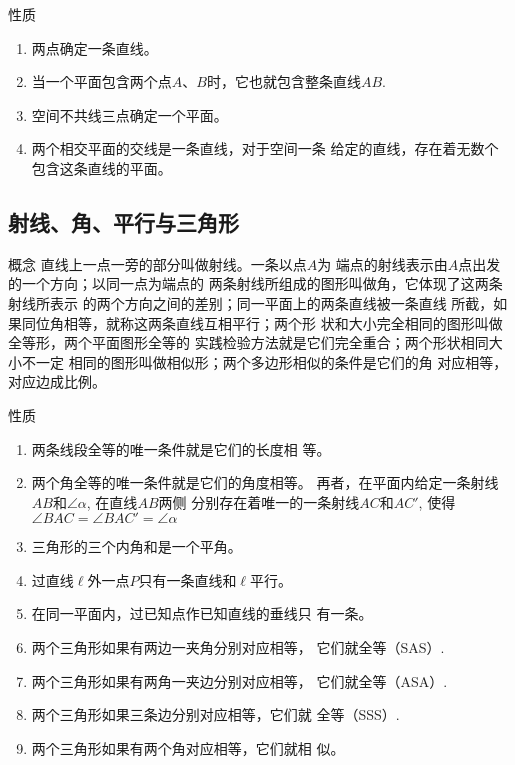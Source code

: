 \begin{blk}
	{性质}
\begin{enumerate}
	\item 两点确定一条直线。
	\item 当一个平面包含两个点$A$、$B$时，它也就包含整条直线$AB$.
	\item 空间不共线三点确定一个平面。
	\item 两个相交平面的交线是一条直线，对于空间一条
	给定的直线，存在着无数个包含这条直线的平面。
\end{enumerate}
\end{blk}

\subsection*{射线、角、平行与三角形}

\begin{blk}
	{概念} 直线上一点一旁的部分叫做射线。一条以点$A$为
端点的射线表示由$A$点出发的一个方向；以同一点为端点的
两条射线所组成的图形叫做角，它体现了这两条射线所表示
的两个方向之间的差别；同一平面上的两条直线被一条直线
所截，如果同位角相等，就称这两条直线互相平行；两个形
状和大小完全相同的图形叫做全等形，两个平面图形全等的
实践检验方法就是它们完全重合；两个形状相同大小不一定
相同的图形叫做相似形；两个多边形相似的条件是它们的角
对应相等，对应边成比例。
\end{blk}

\begin{blk}{性质}
\begin{enumerate}
	\item 两条线段全等的唯一条件就是它们的长度相
	等。
	\item 两个角全等的唯一条件就是它们的角度相等。
	再者，在平面内给定一条射线$AB$和$\angle \alpha$, 在直线$AB$两侧
	分别存在着唯一的一条射线$AC$和$AC'$, 使得$\angle BAC=
	\angle BAC'=\angle\alpha$
	\item 三角形的三个内角和是一个平角。
	\item 过直线$\ell$外一点$P$只有一条直线和$\ell$平行。
	\item 在同一平面内，过已知点作已知直线的垂线只
	有一条。
	\item 两个三角形如果有两边一夹角分别对应相等，
	它们就全等（SAS）.
	\item 两个三角形如果有两角一夹边分别对应相等，
	它们就全等（ASA）.
	\item 两个三角形如果三条边分别对应相等，它们就
	全等（SSS）.
	\item 两个三角形如果有两个角对应相等，它们就相
	似。
	\end{enumerate}
\end{blk}

